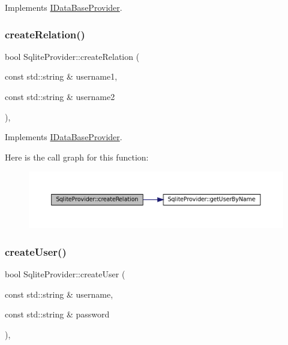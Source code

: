 Implements \mbox{\hyperlink{classIDataBaseProvider_adb9f20d5c7f73566b279c8564905429d}{I\+Data\+Base\+Provider}}.

\mbox{\label{classSqliteProvider_a452f16560299d7e5f9c3f738cba13172}} 
\subsubsection{\texorpdfstring{create\+Relation()}{createRelation()}\hspace{0.1cm}{\footnotesize\ttfamily [2/2]}}
{\footnotesize\ttfamily bool Sqlite\+Provider\+::create\+Relation (\begin{DoxyParamCaption}\item[{const std\+::string \&}]{username1,  }\item[{const std\+::string \&}]{username2 }\end{DoxyParamCaption})\hspace{0.3cm}{\ttfamily [override]}, {\ttfamily [virtual]}}



Implements \mbox{\hyperlink{classIDataBaseProvider_ade3438db196aed2c67268f09a1b4a266}{I\+Data\+Base\+Provider}}.

Here is the call graph for this function\+:
\nopagebreak
\begin{figure}[H]
\begin{center}
\leavevmode
\includegraphics[width=350pt]{classSqliteProvider_a452f16560299d7e5f9c3f738cba13172_cgraph}
\end{center}
\end{figure}
\mbox{\label{classSqliteProvider_a7483b0b7156adba736b6b27f8b1826a0}} 
\subsubsection{\texorpdfstring{create\+User()}{createUser()}}
{\footnotesize\ttfamily bool Sqlite\+Provider\+::create\+User (\begin{DoxyParamCaption}\item[{const std\+::string \&}]{username,  }\item[{const std\+::string \&}]{password }\end{DoxyParamCaption})\hspace{0.3cm}{\ttfamily [override]}, {\ttfamily [virtual]}}



